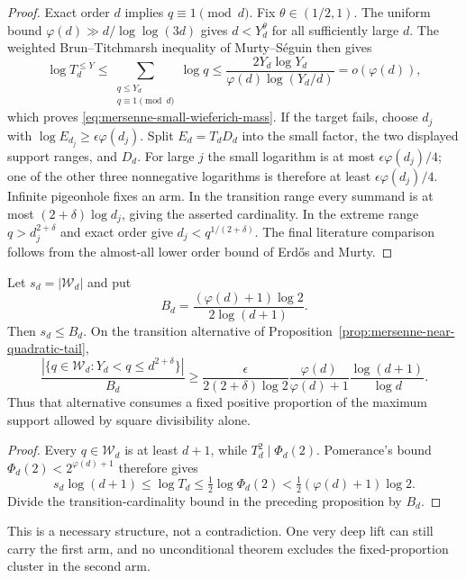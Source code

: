\begin{proof}
Exact order $d$ implies $q\equiv1\pmod d$.  Fix
$\theta\in(1/2,1)$.  The uniform bound
$\varphi(d)\gg d/\log\log(3d)$ gives $d<Y_d^\theta$ for all sufficiently
large $d$.  The weighted Brun--Titchmarsh inequality of Murty--S\'eguin
\cite[Theorem~2.4]{MurtySeguin2019} then gives
\[
 \log T_d^{\le Y}
 \le\sum_{\substack{q\le Y_d\\q\equiv1\pmod d}}\log q
 \le\frac{2Y_d\log Y_d}
          {\varphi(d)\log(Y_d/d)}
 =o(\varphi(d)),
\]
which proves \eqref{eq:mersenne-small-wieferich-mass}.  If the target fails,
choose $d_j$ with
$\log E_{d_j}\ge\epsilon\varphi(d_j)$.  Split
$E_d=T_dD_d$ into the small factor, the two displayed support ranges, and
$D_d$.  For large $j$ the small logarithm is at most
$\epsilon\varphi(d_j)/4$; one of the other three nonnegative logarithms is
therefore at least $\epsilon\varphi(d_j)/4$.  Infinite pigeonhole fixes an
arm.  In the transition range every summand is at most
$(2+\delta)\log d_j$, giving the asserted cardinality.  In the extreme range
$q>d_j^{2+\delta}$ and exact order give
$d_j<q^{1/(2+\delta)}$.  The final literature comparison follows from the
almost-all lower order bound of Erd\H{o}s and Murty.
\end{proof}

\begin{corollary}
\label{cor:mersenne-transition-square-budget}
Let $s_d=|\mathcal W_d|$ and put
\[
 B_d=\frac{(\varphi(d)+1)\log2}{2\log(d+1)}.
\]
Then $s_d\le B_d$.  On the transition alternative of
Proposition~\ref{prop:mersenne-near-quadratic-tail},
\[
 \frac{|\{q\in\mathcal W_d:Y_d<q\le d^{2+\delta}\}|}{B_d}
 \ge
 \frac{\epsilon}{2(2+\delta)\log2}
 \frac{\varphi(d)}{\varphi(d)+1}
 \frac{\log(d+1)}{\log d}.
\]
Thus that alternative consumes a fixed positive proportion of the maximum
support allowed by square divisibility alone.
\end{corollary}

\begin{proof}
Every $q\in\mathcal W_d$ is at least $d+1$, while
$T_d^2\mid\Phi_d(2)$.  Pomerance's bound
$\Phi_d(2)<2^{\varphi(d)+1}$ \cite{PomeranceCyclotomic2025} therefore gives
\[
 s_d\log(d+1)\le\log T_d
 \le\tfrac12\log\Phi_d(2)
 <\tfrac12(\varphi(d)+1)\log2.
\]
Divide the transition-cardinality bound in the preceding proposition by
$B_d$.
\end{proof}

This is a necessary structure, not a contradiction.  One very deep lift can
still carry the first arm, and no unconditional theorem excludes the
fixed-proportion cluster in the second arm.

